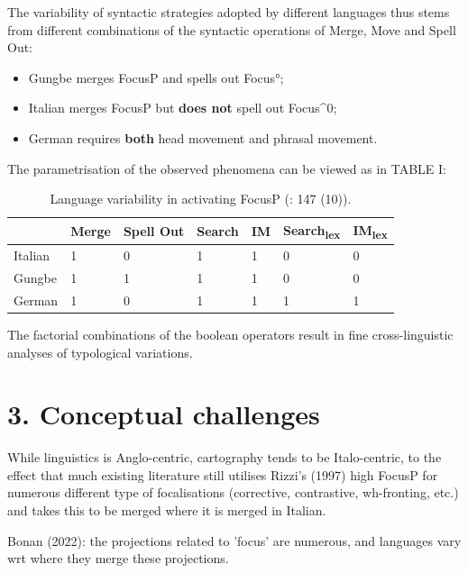 \documentclass[fleqn,10pt]{wlscirep}
\begin{document}
\noindent The variability of syntactic strategies adopted by different languages thus stems from different combinations of the syntactic operations of Merge, Move and Spell Out: 

\begin{itemize}
\item[\ding{227}] Gungbe merges FocusP and spells out Focus°; 
\item[\ding{227}] \vspace*{-2mm} Italian merges FocusP but \textbf{does not} spell out Focus^0; 
\item[\ding{227}] \vspace*{-2mm} German requires \textbf{both} head movement and phrasal movement. 
\end{itemize}

\noindent The parametrisation of the observed phenomena can be viewed as in TABLE I:

\begin{table}[H]
    \centering
    \begin{tabular}{|l|l|l|l|l|l|l|}
    \hline
     & Merge & Spell Out & Search & IM & Search\textsubscript{lex} & IM\textsubscript{lex} \\
    \hline
    Italian & 1 & 0 & 1 & 1 & 0 & 0 \\
    \hline
    Gungbe & 1 & 1 & 1 & 1 & 0 & 0 \\
    \hline
    German & 1 & 0 & 1 & 1 & 1 & 1 \\
    \hline
    \end{tabular}
    \caption{\label{tab:samp}Language variability in activating FocusP (\citealt{samo2019cartography}: 147 (10)).}
    \end{table}

\noindent The factorial combinations of the boolean operators result in fine cross-linguistic analyses of typological variations.

\section*{3. Conceptual challenges}

While linguistics is Anglo-centric, cartography tends to be Italo-centric, to the effect that much existing literature still utilises Rizzi's (1997) high FocusP for numerous different type of focalisations (corrective, contrastive, wh-fronting, etc.) and takes this to be merged where it is merged in Italian. 

\noindent Bonan (2022): the projections related to 'focus' are numerous, and languages vary wrt where they merge these projections.
\end{document}
